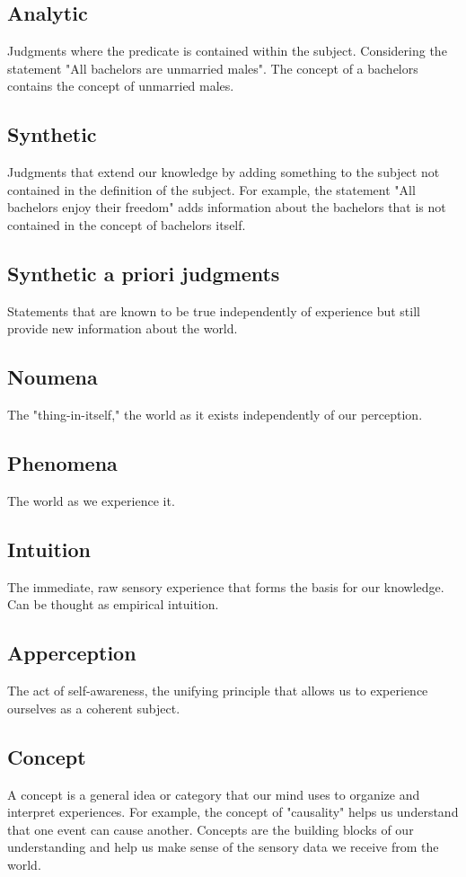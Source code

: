 \documentclass[a4paper]{article}
\begin{document}
\subsection{Analytic}
Judgments where the predicate is contained within the subject. 
Considering the statement "All bachelors are unmarried males".
The concept of a bachelors contains the concept of unmarried males. 

\subsection{Synthetic}
Judgments that extend our knowledge by adding something to the subject not contained in the definition of the subject.
For example, the statement "All bachelors enjoy their freedom" adds information about the bachelors that is not contained in the concept of bachelors itself.

\subsection{Synthetic a priori judgments}
Statements that are known to be true independently of experience but still provide new information about the world.

\subsection{Noumena}
The "thing-in-itself," the world as it exists independently of our perception.

\subsection{Phenomena}
The world as we experience it.

\subsection{Intuition}
The immediate, raw sensory experience that forms the basis for our knowledge.
Can be thought as empirical intuition. 

\subsection{Apperception}
The act of self-awareness, the unifying principle that allows us to experience ourselves as a coherent subject.

\subsection{Concept}
A concept is a general idea or category that our mind uses to organize and interpret experiences. 
For example, the concept of "causality" helps us understand that one event can cause another. 
Concepts are the building blocks of our understanding and help us make sense of the sensory data we receive from the world.
\end{document}
